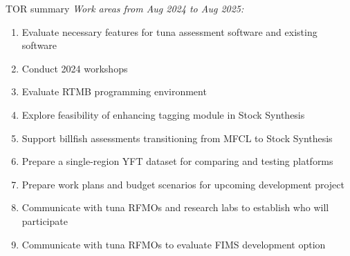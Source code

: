\documentclass[aspectratio=169,fleqn]{beamer}
\begin{document}
\begin{frame}{TOR summary}\small
  \textit{\darkgray\fns Work areas from Aug 2024 to Aug 2025:}\\[1ex]
  \begin{enumerate}
    \item Evaluate {\darkgreen necessary features} for tuna assessment software
    and {\darkgreen existing software}\\[1.5ex]
    \item Conduct 2024 {\darkgreen workshops}\\[1.5ex]
    \item Evaluate {\darkgreen RTMB} programming environment\\[1.5ex]
    \item Explore feasibility of enhancing {\darkgreen tagging module} in Stock
    Synthesis\\[1.5ex]
    \item Support {\darkgreen billfish assessments} transitioning from MFCL to
    Stock Synthesis\\[1.5ex]
    \item Prepare a {\darkgreen single-region YFT} dataset for comparing and
    testing platforms\\[1.5ex]
    \item Prepare work plans and budget scenarios for {\darkgreen upcoming
      development project}\\[1.5ex]
    \item Communicate with tuna RFMOs and research labs to establish {\darkgreen
      who will participate}\\[1.5ex]
    \item Communicate with tuna RFMOs to evaluate {\darkgreen FIMS development
      option}\\[3ex]
  \end{enumerate}
\end{frame}

\end{document}
